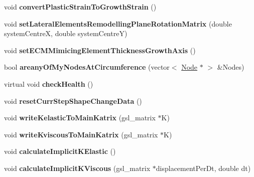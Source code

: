 \begin{DoxyCompactItemize}
\item 
\hypertarget{classShapeBase_a78d45ea18373ce5e21b7567e9e6bdabc}{}void {\bfseries convert\+Plastic\+Strain\+To\+Growth\+Strain} ()\label{classShapeBase_a78d45ea18373ce5e21b7567e9e6bdabc}

\item 
\hypertarget{classShapeBase_abad6253cc3a8a9d4c475967a96606de1}{}void {\bfseries set\+Lateral\+Elements\+Remodelling\+Plane\+Rotation\+Matrix} (double system\+Centre\+X, double system\+Centre\+Y)\label{classShapeBase_abad6253cc3a8a9d4c475967a96606de1}

\item 
\hypertarget{classShapeBase_aaec4fe1a744c8e584c843c2b775bf7ca}{}void {\bfseries set\+E\+C\+M\+Mimicing\+Element\+Thickness\+Growth\+Axis} ()\label{classShapeBase_aaec4fe1a744c8e584c843c2b775bf7ca}

\item 
\hypertarget{classShapeBase_ace99764b2dda719995b93cd96ae10b4f}{}bool {\bfseries areany\+Of\+My\+Nodes\+At\+Circumference} (vector$<$ \hyperlink{classNode}{Node} $\ast$ $>$ \&Nodes)\label{classShapeBase_ace99764b2dda719995b93cd96ae10b4f}

\item 
\hypertarget{classShapeBase_adb6927dd05e3f6aa1c5ac5d32a30b5da}{}virtual void {\bfseries check\+Health} ()\label{classShapeBase_adb6927dd05e3f6aa1c5ac5d32a30b5da}

\item 
\hypertarget{classShapeBase_a3c08833714950163efbf15f9b1c26765}{}void {\bfseries reset\+Curr\+Step\+Shape\+Change\+Data} ()\label{classShapeBase_a3c08833714950163efbf15f9b1c26765}

\item 
\hypertarget{classShapeBase_a2bfdde187477364a5a0e2220ea6b2e0e}{}void {\bfseries write\+Kelastic\+To\+Main\+Katrix} (gsl\+\_\+matrix $\ast$K)\label{classShapeBase_a2bfdde187477364a5a0e2220ea6b2e0e}

\item 
\hypertarget{classShapeBase_a388d38c2d6588c7ddf622f1deed53853}{}void {\bfseries write\+Kviscous\+To\+Main\+Katrix} (gsl\+\_\+matrix $\ast$K)\label{classShapeBase_a388d38c2d6588c7ddf622f1deed53853}

\item 
\hypertarget{classShapeBase_a922c41864d4826725cc72089046f818c}{}void {\bfseries calculate\+Implicit\+K\+Elastic} ()\label{classShapeBase_a922c41864d4826725cc72089046f818c}

\item 
\hypertarget{classShapeBase_a20c23d30b7f9f3bc7ed2fde542401aeb}{}void {\bfseries calculate\+Implicit\+K\+Viscous} (gsl\+\_\+matrix $\ast$displacement\+Per\+Dt, double dt)\label{classShapeBase_a20c23d30b7f9f3bc7ed2fde542401aeb}


\end{DoxyCompactItemize}
